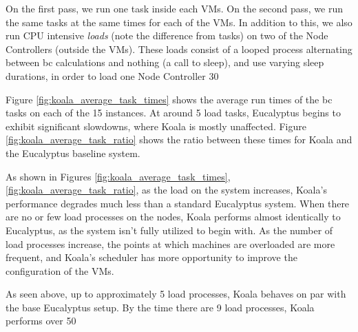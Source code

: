 On the first pass, we run one task inside each VMs.  On the second pass, we run the same tasks at the same times for each of the VMs.  In addition to this, we also run CPU intensive \emph{loads} (note the difference from tasks) on two of the Node Controllers (outside the VMs).  These loads consist of a looped process alternating between bc calculations and nothing (a call to sleep), and use varying sleep durations, in order to load one Node Controller 30%

Figure \ref{fig:koala_average_task_times} shows the average run times of the bc tasks on each of the 15 instances.  At around 5 load tasks, Eucalyptus begins to exhibit significant slowdowns, where Koala is mostly unaffected.  Figure \ref{fig:koala_average_task_ratio} shows the ratio between these times for Koala and the Eucalyptus baseline system.

As shown in Figures \ref{fig:koala_average_task_times},\ref{fig:koala_average_task_ratio}, as the load on the system increases, Koala's performance degrades much less than a standard Eucalyptus system.  When there are no or few load processes on the nodes, Koala performs almost identically to Eucalyptus, as the system isn't fully utilized to begin with.  As the number of load processes increase, the points at which machines are overloaded are more frequent, and Koala's scheduler has more opportunity to improve the configuration of the VMs.

As seen above, up to approximately 5 load processes, Koala behaves on par with the base Eucalyptus setup.  By the time there are 9 load processes, Koala performs over 50%
